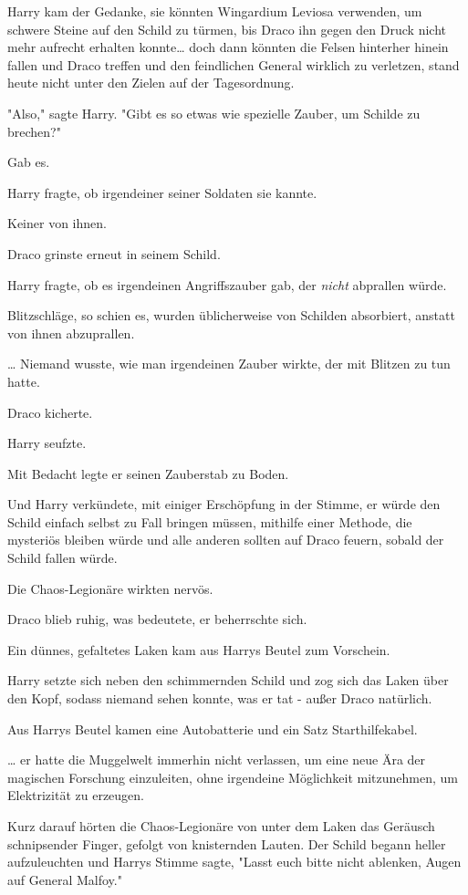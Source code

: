{Harry kam der Gedanke, sie könnten Wingardium Leviosa verwenden, um schwere Steine auf den Schild zu türmen, bis Draco ihn gegen den Druck nicht mehr aufrecht erhalten konnte… doch dann könnten die Felsen hinterher hinein fallen und Draco treffen und den feindlichen General wirklich zu verletzen, stand heute nicht unter den Zielen auf der Tagesordnung.

"Also," sagte Harry. "Gibt es so etwas wie spezielle Zauber, um Schilde zu brechen?"

Gab es.

Harry fragte, ob irgendeiner seiner Soldaten sie kannte.

Keiner von ihnen.

Draco grinste erneut in seinem Schild.

Harry fragte, ob es irgendeinen Angriffszauber gab, der \emph{nicht} abprallen würde.

Blitzschläge, so schien es, wurden üblicherweise von Schilden absorbiert, anstatt von ihnen abzuprallen.

… Niemand wusste, wie man irgendeinen Zauber wirkte, der mit Blitzen zu tun hatte.

Draco kicherte.

Harry seufzte.

Mit Bedacht legte er seinen Zauberstab zu Boden.

Und Harry verkündete, mit einiger Erschöpfung in der Stimme, er würde den Schild einfach selbst zu Fall bringen müssen, mithilfe einer Methode, die mysteriös bleiben würde und alle anderen sollten auf Draco feuern, sobald der Schild fallen würde.

Die Chaos-Legionäre wirkten nervös.

Draco blieb ruhig, was bedeutete, er beherrschte sich.

Ein dünnes, gefaltetes Laken kam aus Harrys Beutel zum Vorschein.

Harry setzte sich neben den schimmernden Schild und zog sich das Laken über den Kopf, sodass niemand sehen konnte, was er tat - außer Draco natürlich.

Aus Harrys Beutel kamen eine Autobatterie und ein Satz Starthilfekabel.

… er hatte die Muggelwelt immerhin nicht verlassen, um eine neue Ära der magischen Forschung einzuleiten, ohne irgendeine Möglichkeit mitzunehmen, um Elektrizität zu erzeugen.

Kurz darauf hörten die Chaos-Legionäre von unter dem Laken das Geräusch schnipsender Finger, gefolgt von knisternden Lauten. Der Schild begann heller aufzuleuchten und Harrys Stimme sagte, "Lasst euch bitte nicht ablenken, Augen auf General Malfoy."

}
